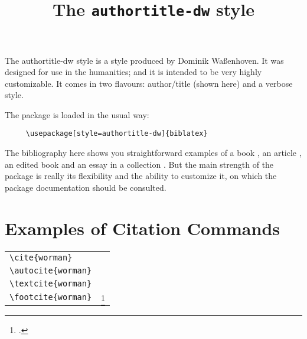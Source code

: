 \documentclass{article}
\begin{document}
 

\title{The \texttt{authortitle-dw} style}
\author{}\date{} 
\maketitle 
\thispagestyle{empty}


The \textsf{authortitle-dw} style is a style produced by Dominik Waßenhoven. It was designed for use in the humanities; and it is intended to be very highly customizable. It comes in two flavours: author/title (shown here) and a verbose style.

\quad The package is loaded in the usual way:
\begin{verbatim}
     \usepackage[style=authortitle-dw]{biblatex}
\end{verbatim}

\quad The bibliography here shows you straightforward examples of a book \autocite{worman}, an article \autocite{reese}, an edited book \autocite{aristotle:anima} and an essay in a collection \autocite{gaonkar:in}.  But the main strength of the package is really its flexibility and the ability to customize it, on which the package documentation should be consulted.

\section*{Examples of Citation Commands}

\begin{tabularx}{\textwidth}{lX}
\verb|\cite{worman}| & \cite{worman} \\
\verb|\autocite{worman}| & \strut\autocite{worman} \\
\verb|\textcite{worman}| & \textcite{worman} \\
\verb|\footcite{worman}| & \strut\footcite{worman}
\end{tabularx}


\printbibliography[title={Sample Bibliography}]
\end{document}

